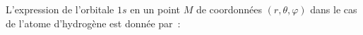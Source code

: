 %
%
%
%
%
%
%
%
%
%


L'expression de l'orbitale $1s$ en un point $ M$ de coordonn\'ees  
$(r,\theta,\varphi)$ dans le cas de l'atome d'hydrog\`ene est donn\'ee par~:


